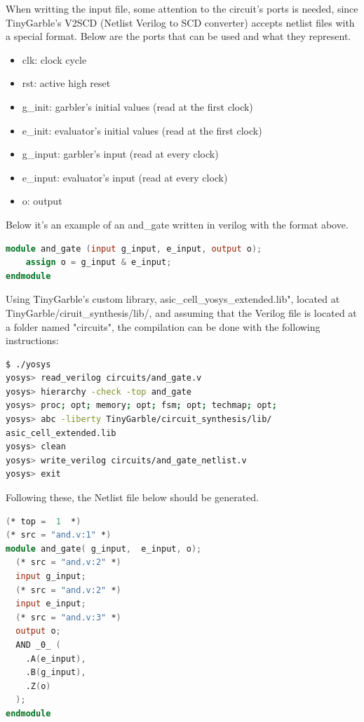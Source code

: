\begin{refsection}
When writting the input file, some attention to the circuit's ports is needed, since TinyGarble's V2SCD (Netlist Verilog to SCD converter) accepts netlist files with a special format. 
Below are the ports that can be used and what they represent.

\begin{itemize}  
\item clk: clock cycle
\item rst: active high reset
\item g\_init: garbler's initial values (read at the first clock)
\item e\_init: evaluator's initial values (read at the first clock)
\item g\_input: garbler's input (read at every clock)
\item e\_input: evaluator's input (read at every clock)
\item o: output
\end{itemize}

Below it's an example of an and\_gate written in verilog with the format above.

\begin{lstlisting}[caption={and\_gate.v}, language=Verilog, captionpos=b] 
module and_gate (input g_input, e_input, output o);
	assign o = g_input & e_input;
endmodule
\end{lstlisting}

Using TinyGarble's custom library, asic\_cell\_yosys\_extended.lib", located at TinyGarble/ciruit\_synthesis/lib/, and assuming that the Verilog file is located at a folder named "circuits", the compilation can be done with the following instructions:

\begin{lstlisting}[caption={Yosys instructions to compile the HDL file to a Netlist file}, language=bash, captionpos=b] 
$ ./yosys
yosys> read_verilog circuits/and_gate.v
yosys> hierarchy -check -top and_gate
yosys> proc; opt; memory; opt; fsm; opt; techmap; opt;
yosys> abc -liberty TinyGarble/circuit_synthesis/lib/
asic_cell_extended.lib
yosys> clean
yosys> write_verilog circuits/and_gate_netlist.v
yosys> exit					
\end{lstlisting}

Following these, the Netlist file below should be generated.

\begin{lstlisting}[caption={and\_gate\_netlist.v}, language=Verilog, captionpos=b] 
(* top =  1  *)
(* src = "and.v:1" *)
module and_gate( g_input,  e_input, o);
  (* src = "and.v:2" *)
  input g_input;
  (* src = "and.v:2" *)
  input e_input;
  (* src = "and.v:3" *)
  output o;
  AND _0_ (
    .A(e_input),
    .B(g_input),
    .Z(o)
  );
endmodule
\end{lstlisting}


\end{refsection}
